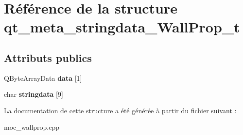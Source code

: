 \hypertarget{structqt__meta__stringdata__WallProp__t}{\section{Référence de la structure qt\+\_\+meta\+\_\+stringdata\+\_\+\+Wall\+Prop\+\_\+t}
\label{structqt__meta__stringdata__WallProp__t}
}
\subsection*{Attributs publics}
\begin{DoxyCompactItemize}
\item 
\hypertarget{structqt__meta__stringdata__WallProp__t_a144704d6205c3e63ac6b2950f2d30817}{Q\+Byte\+Array\+Data {\bfseries data} \mbox{[}1\mbox{]}}\label{structqt__meta__stringdata__WallProp__t_a144704d6205c3e63ac6b2950f2d30817}

\item 
\hypertarget{structqt__meta__stringdata__WallProp__t_ae4963ae1fc53d7ba327cd71d2a6187fa}{char {\bfseries stringdata} \mbox{[}9\mbox{]}}\label{structqt__meta__stringdata__WallProp__t_ae4963ae1fc53d7ba327cd71d2a6187fa}

\end{DoxyCompactItemize}


La documentation de cette structure a été générée à partir du fichier suivant \+:\begin{DoxyCompactItemize}
\item 
moc\+\_\+wallprop.\+cpp\end{DoxyCompactItemize}
